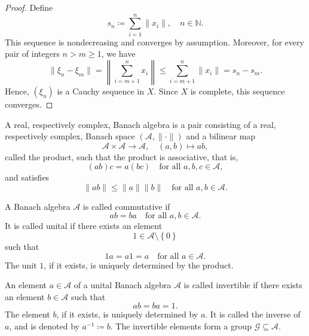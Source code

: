 \begin{proof}
    Define 
    \[
        s_n \coloneqq \sum_{i=1}^n \lVert x_i \rVert, \quad n \in \mathbb{N}.   
    \]
    This sequence is nondecreasing and converges by assumption. Moreover, for every pair of integers \(n > m \ge 1\), we have 
    \[
        \lVert \xi _n - \xi _m \rVert = \left\lVert \sum_{i=m+1}^n x_i  \right\rVert \le \sum_{i=m+1}^n \lVert x_i \rVert = s_n - s_m.   
    \] 
    Hence, \((\xi _n)\) is a Cauchy sequence in \(X\). Since \(X\) is complete, this sequence converges.  
\end{proof}

\begin{definition}
    A real, respectively complex, Banach algebra is a pair consisting of a real, respectively complex, Banach space \((\mathcal{A} , \lVert \cdot \rVert )\) and a bilinear map 
    \[
        \mathcal{A} \times \mathcal{A} \to \mathcal{A}, \quad (a, b) \mapsto ab,
    \] 
    called the product, such that the product is associative, that is,
    \[
        (ab) c = a (bc) \quad \text{for all } a, b, c \in \mathcal{A}, 
    \]
    and satisfies 
    \[
        \lVert ab \rVert \le \lVert a \rVert \lVert b \rVert \quad \text{for all } a, b \in \mathcal{A}.    
    \]
\end{definition}

\begin{remark}
    A Banach algebra \(\mathcal{A} \) is called commutative if 
    \[
        ab = ba \quad \text{for all } a, b \in \mathcal{A}. 
    \] 
    It is called unital if there exists an element 
    \[
        1 \in \mathcal{A} \setminus \left\{ 0 \right\} 
    \]
    such that 
    \[
        1 a = a 1 = a \quad \text{for all } a \in \mathcal{A}. 
    \]
    The unit \(1\), if it exists, is uniquely determined by the product. 

    An element \(a \in \mathcal{A}\) of a unital Banach algebra \(\mathcal{A}\) is called invertible if there exists an element \(b \in \mathcal{A}\) such that 
    \[
        ab = ba = 1.
    \]   
    The element \(b\), if it exists, is uniquely determined by \(a\). It is called the inverse of \(a\), and is denoted by \(a^{-1} \coloneqq b\). The invertible elements form a group \(\mathcal{G} \subseteq \mathcal{A}\).     
\end{remark}

